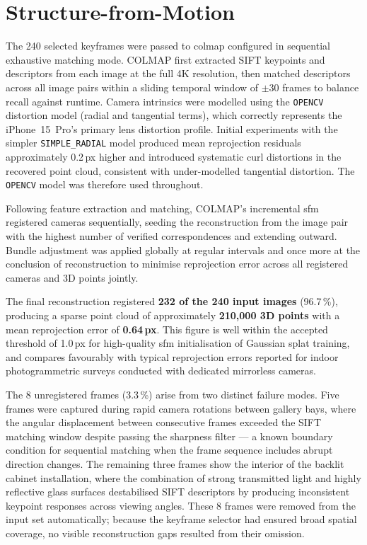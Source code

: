 \section{Structure-from-Motion}
\label{sec:recon-sfm}

The 240 selected keyframes were passed to \acrshort{colmap} \parencite{Schoenberger2016sfm,Schoenberger2016mvs} configured in sequential exhaustive matching mode. COLMAP first extracted SIFT keypoints and descriptors from each image at the full 4K resolution, then matched descriptors across all image pairs within a sliding temporal window of $\pm$30 frames to balance recall against runtime. Camera intrinsics were modelled using the \texttt{OPENCV} distortion model (radial and tangential terms), which correctly represents the iPhone~15~Pro's primary lens distortion profile. Initial experiments with the simpler \texttt{SIMPLE\_RADIAL} model produced mean reprojection residuals approximately 0.2\,px higher and introduced systematic curl distortions in the recovered point cloud, consistent with under-modelled tangential distortion. The \texttt{OPENCV} model was therefore used throughout.

Following feature extraction and matching, COLMAP's incremental \acrshort{sfm} registered cameras sequentially, seeding the reconstruction from the image pair with the highest number of verified correspondences and extending outward. Bundle adjustment was applied globally at regular intervals and once more at the conclusion of reconstruction to minimise reprojection error across all registered cameras and 3D points jointly.

The final reconstruction registered \textbf{232 of the 240 input images} (96.7\,\%), producing a sparse point cloud of approximately \textbf{210,000 3D points} with a mean reprojection error of \textbf{0.64\,px}. This figure is well within the accepted threshold of 1.0\,px for high-quality \acrshort{sfm} initialisation of Gaussian splat training, and compares favourably with typical reprojection errors reported for indoor photogrammetric surveys conducted with dedicated mirrorless cameras.

The 8 unregistered frames (3.3\,\%) arise from two distinct failure modes. Five frames were captured during rapid camera rotations between gallery bays, where the angular displacement between consecutive frames exceeded the SIFT matching window despite passing the sharpness filter — a known boundary condition for sequential matching when the frame sequence includes abrupt direction changes. The remaining three frames show the interior of the backlit cabinet installation, where the combination of strong transmitted light and highly reflective glass surfaces destabilised SIFT descriptors by producing inconsistent keypoint responses across viewing angles. These 8 frames were removed from the input set automatically; because the keyframe selector had ensured broad spatial coverage, no visible reconstruction gaps resulted from their omission.

